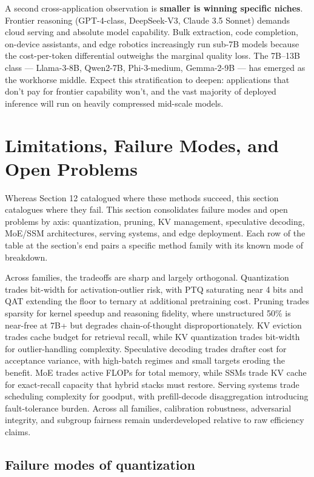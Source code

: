 A second cross-application observation is \textbf{smaller is winning specific niches}. Frontier reasoning (GPT-4-class, DeepSeek-V3, Claude 3.5 Sonnet) demands cloud serving and absolute model capability. Bulk extraction, code completion, on-device assistants, and edge robotics increasingly run sub-7B models because the cost-per-token differential outweighs the marginal quality loss. The 7B--13B class --- Llama-3-8B, Qwen2-7B, Phi-3-medium, Gemma-2-9B --- has emerged as the workhorse middle. Expect this stratification to deepen: applications that don't pay for frontier capability won't, and the vast majority of deployed inference will run on heavily compressed mid-scale models.

\section{Limitations, Failure Modes, and Open Problems}\label{limitations-failure-modes-and-open-problems}

Whereas Section 12 catalogued where these methods succeed, this section catalogues where they fail. This section consolidates failure modes and open problems by axis: quantization, pruning, KV management, speculative decoding, MoE/SSM architectures, serving systems, and edge deployment. Each row of the table at the section's end pairs a specific method family with its known mode of breakdown.

Across families, the tradeoffs are sharp and largely orthogonal. Quantization trades bit-width for activation-outlier risk, with PTQ saturating near 4 bits and QAT extending the floor to ternary at additional pretraining cost. Pruning trades sparsity for kernel speedup and reasoning fidelity, where unstructured 50\% is near-free at 7B+ but degrades chain-of-thought disproportionately. KV eviction trades cache budget for retrieval recall, while KV quantization trades bit-width for outlier-handling complexity. Speculative decoding trades drafter cost for acceptance variance, with high-batch regimes and small targets eroding the benefit. MoE trades active FLOPs for total memory, while SSMs trade KV cache for exact-recall capacity that hybrid stacks must restore. Serving systems trade scheduling complexity for goodput, with prefill-decode disaggregation introducing fault-tolerance burden. Across all families, calibration robustness, adversarial integrity, and subgroup fairness remain underdeveloped relative to raw efficiency claims.

\subsection{Failure modes of quantization}\label{failure-modes-of-quantization}

